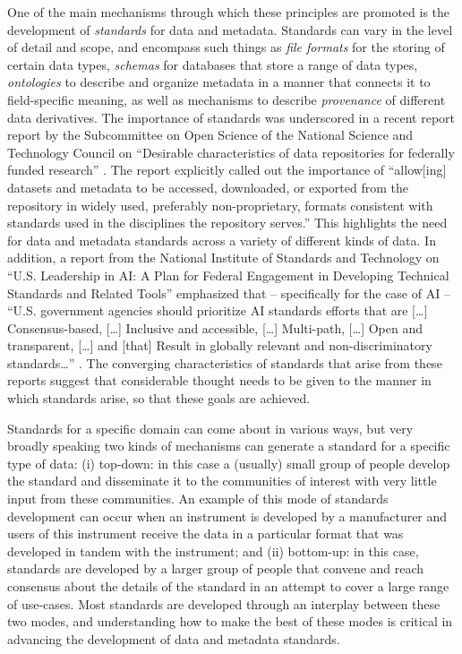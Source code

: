 \documentclass[
  letterpaper,
  DIV=11,
  numbers=noendperiod]{scrartcl}
\begin{document}
One of the main mechanisms through which these principles are promoted
is the development of \emph{standards} for data and metadata. Standards
can vary in the level of detail and scope, and encompass such things as
\emph{file formats} for the storing of certain data types,
\emph{schemas} for databases that store a range of data types,
\emph{ontologies} to describe and organize metadata in a manner that
connects it to field-specific meaning, as well as mechanisms to describe
\emph{provenance} of different data derivatives. The importance of
standards was underscored in a recent report report by the Subcommittee
on Open Science of the National Science and Technology Council on
``Desirable characteristics of data repositories for federally funded
research'' \cite{nstc2022desirable}. The report explicitly called out
the importance of ``allow{[}ing{]} datasets and metadata to be accessed,
downloaded, or exported from the repository in widely used, preferably
non-proprietary, formats consistent with standards used in the
disciplines the repository serves.'' This highlights the need for data
and metadata standards across a variety of different kinds of data. In
addition, a report from the National Institute of Standards and
Technology on ``U.S. Leadership in AI: A Plan for Federal Engagement in
Developing Technical Standards and Related Tools'' emphasized that --
specifically for the case of AI -- ``U.S. government agencies should
prioritize AI standards efforts that are {[}\ldots{]} Consensus-based,
{[}\ldots{]} Inclusive and accessible, {[}\ldots{]} Multi-path,
{[}\ldots{]} Open and transparent, {[}\ldots{]} and {[}that{]} Result in
globally relevant and non-discriminatory standards\ldots{}''
\cite{NIST2019}. The converging characteristics of standards that arise
from these reports suggest that considerable thought needs to be given
to the manner in which standards arise, so that these goals are
achieved.

Standards for a specific domain can come about in various ways, but very
broadly speaking two kinds of mechanisms can generate a standard for a
specific type of data: (i) top-down: in this case a (usually) small
group of people develop the standard and disseminate it to the
communities of interest with very little input from these communities.
An example of this mode of standards development can occur when an
instrument is developed by a manufacturer and users of this instrument
receive the data in a particular format that was developed in tandem
with the instrument; and (ii) bottom-up: in this case, standards are
developed by a larger group of people that convene and reach consensus
about the details of the standard in an attempt to cover a large range
of use-cases. Most standards are developed through an interplay between
these two modes, and understanding how to make the best of these modes
is critical in advancing the development of data and metadata standards.
\end{document}
